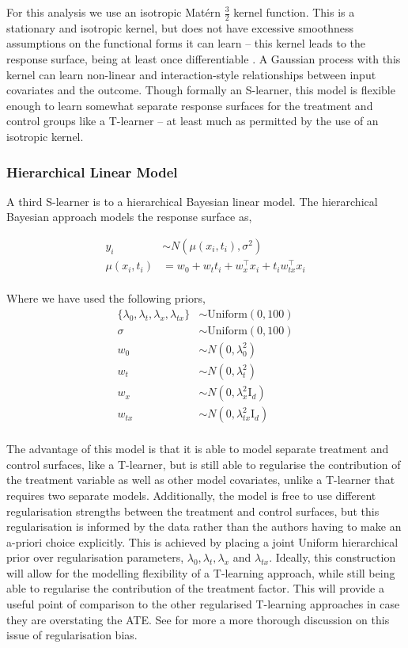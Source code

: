 \documentclass[12pt, a4paper]{article}
\begin{document}
For this analysis we use an isotropic Mat\'{e}rn $\frac{3}{2}$ kernel function.
This is a stationary and isotropic kernel, but does not have excessive
smoothness assumptions on the functional forms it can learn -- this kernel
leads to the response surface, being at least once differentiable
\citep{williams2006}. A Gaussian process with this kernel can learn non-linear
and interaction-style relationships between input covariates and the outcome.
Though formally an S-learner, this model is flexible enough to learn somewhat
separate response surfaces for the treatment and control groups like a T-learner
-- at least much as permitted by the use of an isotropic kernel.


\subsubsection*{Hierarchical Linear Model}

A third S-learner is to a hierarchical Bayesian linear model. The hierarchical
Bayesian approach models the response surface as,

\begin{align*}
y_i &\sim N(\mu(x_i,t_i),\sigma^2) \\
\mu(x_i,t_i) &= w_0 + w_t t_i + w_x^\top x_i + t_i w_{tx}^\top x_i \\
\end{align*}

Where we have used the following priors,
\begin{align*}
\{ \lambda_0, \lambda_t, \lambda_x, \lambda_{tx} \} &\sim 
  \textrm{Uniform}(0, 100) \\
\sigma &\sim \textrm{Uniform}(0, 100) \\
w_0 &\sim N(0,\lambda_0^2) \\
w_t &\sim N(0,\lambda_t^2) \\
w_x &\sim N(0,\lambda_x^2 \textrm{I}_d) \\
w_{tx} &\sim N(0,\lambda^2_{tx} \textrm{I}_d) \\
\end{align*}
 
The advantage of this model is that it is able to model separate treatment and
control surfaces, like a T-learner, but is still able to regularise the
contribution of the treatment variable as well as other model covariates,
unlike a T-learner that requires two separate models. Additionally, the model
is free to use different regularisation strengths between the treatment and
control surfaces, but this regularisation is informed by the data rather than
the authors having to make an a-priori choice explicitly. This is achieved by
placing a joint Uniform hierarchical prior over regularisation parameters,
$\lambda_0, \lambda_t, \lambda_x$ and $\lambda_{tx}$. Ideally, this
construction will allow for the modelling flexibility of a T-learning approach,
while still being able to regularise the contribution of the treatment factor.
This will provide a useful point of comparison to the other regularised
T-learning approaches in case they are overstating the ATE. See
\citet{hahn2018} for more a more thorough discussion on this issue of
regularisation bias.
\end{document}
